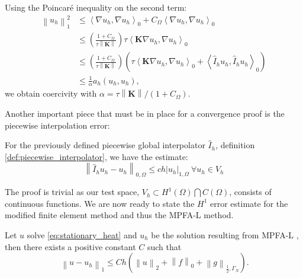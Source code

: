 \documentclass[../Main/main.tex]{subfiles}
\begin{document}
		Using the Poincaré inequality on the second term:
		\begin{equation}
		\begin{aligned} 
		\left \| u_h \right \|_1^2	&\leq \left \langle \nabla u_h,\nabla u_h \right \rangle_0 + C_{\Omega} \left \langle \nabla u_h, \nabla u_h \right \rangle_0 \\
			&\leq \left(\frac{1+C_{\Omega}}{\tau \left \|\bm{K}\right \|} \right) \tau \left  \langle  \bm{K} \nabla  u_h, \nabla u_h \right \rangle_0  \\
			&\leq \left(\frac{1+C_{\Omega}}{\tau \left \|\bm{K}\right \|} \right) \left(\tau \left  \langle  \bm{K} \nabla  u_h, \nabla u_h \right \rangle_0 + \left \langle \hat{I}_h u_h,\hat{I}_h u_h \right \rangle_0\right)\\
			&\leq \frac{1}{\alpha} a_h(u_h,u_h), 
		\end{aligned}
	\end{equation} 
	we obtain coercivity with $\alpha = \tau \left \|\bm{K}\right \|/(1+C_{\Omega})$.\par
	Another important piece that must be in place for a convergence proof is the piecewise interpolation error:
	\begin{lemma}\label{lemma:int_error}
		For the previously defined piecewise global interpolator $\hat{I}_h$, definition \ref{def:piecewise_interpolator}, we have the estimate:
		\begin{equation}
			\left \| \hat{I}_h u_h - u_h \right \|_{0,\Omega} \leq c h | u_h |_{1,\Omega} \ \forall u_h \in V_h
		\end{equation}
	\end{lemma}
The proof is trivial as our test space, $V_h \subset H^1(\Omega)\bigcap C(\Omega)$, consists of continuous functions.
	We are now ready to state the $H^1$ error estimate for the modified finite element method and thus the MPFA-L method.
	\begin{theorem}
		Let $u$ solve \eqref{eq:stationary_heat} and $u_h$ be the solution resulting from MPFA-L , then there exists a positive constant $C$ such that
		\begin{equation}\
			\left \|u - u_h \right \|_1 \leq C h (\left \| u \right \|_2 + \left \| f \right \|_0 + \left \| g \right \|_{\frac{1}{2},\Gamma_N}).
		\end{equation}
	\end{theorem}
\end{document}
